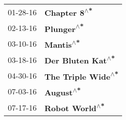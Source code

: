 \begin{supertabular}{p{0.25\columnwidth}p{0.75\columnwidth}}
 01-28-16 &        \textbf{Chapter 8\textsuperscript{$\wedge$*}} \\
 02-13-16 &          \textbf{Plunger\textsuperscript{$\wedge$*}} \\
 03-10-16 &           \textbf{Mantis\textsuperscript{$\wedge$*}} \\
 03-18-16 &   \textbf{Der Bluten Kat\textsuperscript{$\wedge$*}} \\
 04-30-16 &  \textbf{The Triple Wide\textsuperscript{$\wedge$*}} \\
 07-03-16 &           \textbf{August\textsuperscript{$\wedge$*}} \\
 07-17-16 &      \textbf{Robot World\textsuperscript{$\wedge$*}} \\
\end{supertabular}
